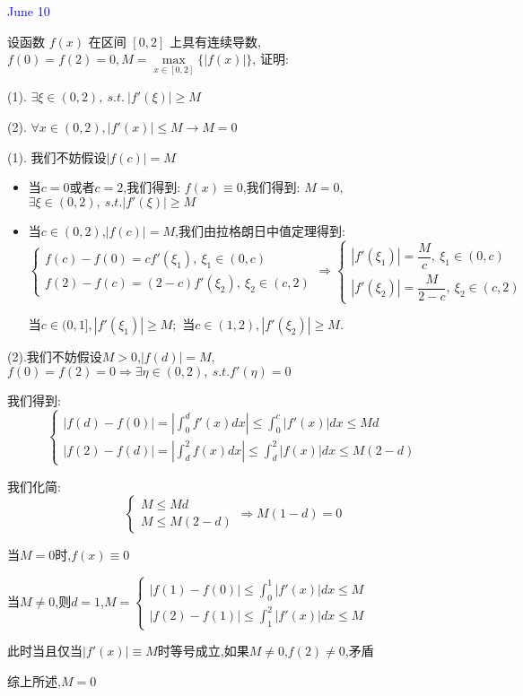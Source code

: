 \textcolor{blue}{June 10}

\begin{example}[][Exam: 32.2.5]
	设函数 $f(x)$ 在区间 $[0,2]$ 上具有连续导数, $f(0)=f(2)=0,M = \max\limits_{x\in[0,2]}\{|f(x)|\}$, 证明: 

(1). $\exists\xi\in(0,2),\ s.t.\ |f'(\xi)|\geq M$

(2). $\forall x\in(0,2), |f'(x)|\leq M \to M=0$
\end{example}

\begin{solution}
	
	(1). 我们不妨假设$|f(c)|=M$
	\begin{itemize}
		\item 当$c=0\text{或者}c=2$,我们得到: $f(x)\equiv 0$,我们得到: $M=0$,$\exists\xi\in(0,2),\ s.t. |f'(\xi)|\geq M$
		\item 当$c\in(0,2)$,$|f(c)|=M$,我们由拉格朗日中值定理得到: 
		$$\left\lbrace
		\begin{array}{l}
			f(c)-f(0)=cf'(\xi_{1}),\ \xi_{1}\in(0,c)\\
			f(2)-f(c)=(2-c)f'(\xi_{2}),\ \xi_{2}\in(c,2)
		\end{array}
		\right. \Rightarrow \left\lbrace
		\begin{array}{l}
			|f'(\xi_{1})|=\dfrac{M}{c},\ \xi_{1}\in(0,c)\\
			|f'(\xi_{2})|=\dfrac{M}{2-c},\ \xi_{2}\in(c,2)
		\end{array}
		\right. $$
		
		当$c\in(0,1],|f'(\xi_{1})|\geq M$;\ 当$c\in(1,2),|f'(\xi_{2})|\geq M$.
	\end{itemize}
	
	
	(2).我们不妨假设$M>0$,$|f(d)|=M$,$f(0)=f(2)=0\Rightarrow \exists \eta\in(0,2),\ s.t. f'(\eta)=0$
	
	我们得到: 
	$$\left\lbrace
	\begin{array}{l}
		|f(d)-f(0)|=|\int_{0}^{d}f'(x)dx|\leq \int_{0}^{c}|f'(x)|dx\leq Md\\
		|f(2)-f(d)|=|\int_{d}^{2}f(x)dx|\leq \int_{d}^{2}|f(x)|dx\leq M(2-d)
	\end{array}
	\right.$$

	我们化简:
	$$\left\lbrace
	\begin{array}{l}
		M\leq Md\\
		M\leq M(2-d)
	\end{array}
	\right.  
	\Rightarrow 
	M(1-d)=0$$
	
	当$M=0$时,$f(x)\equiv 0$
	
	当$M\neq 0$,则$d=1$,$M=\left\lbrace
	\begin{array}{l}
		|f(1)-f(0)|\leq \int_{0}^{1}|f'(x)|dx\leq M\\
		|f(2)-f(1)|\leq \int_{1}^{2}|f'(x)|dx\leq M
	\end{array}
	\right. $	
	
	此时当且仅当$|f'(x)|\equiv M$时等号成立,如果$M\neq 0$,$f(2)\neq 0$,矛盾
	
	综上所述,$M=0$
\end{solution}

